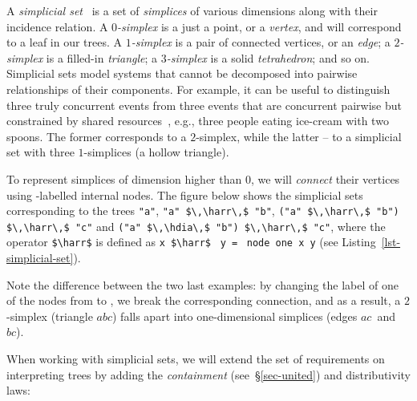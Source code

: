 \documentclass[crc,english]{programming}
\newcommand{\code}[1]{\lstinline[mathescape]|#1|}
\newcommand{\hcode}[1]{{\color{darkblue} \lstinline[keywordstyle={}]|#1|}} %
\newcommand{\hdia}{\,\text{\raisebox{-0.2mm}{\Large\color{darkblue} $\diamond$}}\,}
\newcommand{\harr}{\,\text{\color{darkblue} $\rightarrow$}\,}
\newcommand{\zero}{\raisebox{-0.2mm}{\textcircled{\textsf{0}}}\xspace}
\newcommand{\one}{\raisebox{-0.2mm}{\textcircled{\textsf{\hspace{-0.2mm}1}}}\xspace}
\begin{document}
A \emph{simplicial set}~\cite{friedman_simplicial_sets} is a set of
\emph{simplices} of various dimensions along with their incidence relation.
A \emph{$0$-simplex} is a just a point, or a \emph{vertex}, and will correspond
to a leaf in our trees. A \emph{$1$-simplex} is a pair of connected vertices, or
an \emph{edge}; a \emph{$2$-simplex} is a filled-in \emph{triangle}; a
\emph{$3$-simplex} is a solid \emph{tetrahedron}; and so on. Simplicial sets
model systems that cannot be decomposed into pairwise relationships of their
components. For example, it can be useful to distinguish three truly
concurrent events from three events that are concurrent pairwise but constrained
by shared resources~\cite{rosenblum1989look}, e.g., three people eating
ice-cream with two spoons. The former corresponds to a $2$-simplex, while the
latter -- to a simplicial set with three $1$-simplices (a hollow triangle).

To represent simplices of dimension higher than $0$, we will \emph{connect}
their vertices using \one-labelled internal nodes. The figure below shows the
simplicial sets corresponding to the trees
\code{"a"}, \code{"a" $\,\harr\,$ "b"},
\code{("a" $\,\harr\,$ "b") $\,\harr\,$ "c"} and
\code{("a" $\,\hdia\,$ "b") $\,\harr\,$ "c"}, where the operator \code{$\harr$}
is defined as \hcode{x}~\code{$\harr$}~\hcode{y}~\code{=}~\hcode{node one x y}
(see Listing~\ref{lst-simplicial-set}).

\vspace{2.5mm}
\hfill\hspace{-4mm}\hfill
\vspace{2.5mm}

\noindent
Note the difference between the two last examples: by changing the label of one
of the nodes from \one to \zero, we break the corresponding connection,
and as a result, a $2$-simplex (triangle $\textit{abc}$) falls apart into
one-dimensional simplices (edges $\textit{ac}$~and~$\textit{bc}$).

When working with simplicial sets, we will extend the set of requirements on
interpreting trees by adding the \emph{containment} (see~\S\ref{sec-united}) and
distributivity laws:
\end{document}
